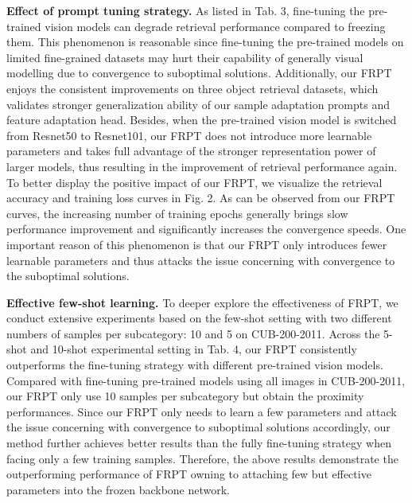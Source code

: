 \documentclass[letterpaper]{article} %
\begin{document}
\textbf{Effect of prompt tuning strategy.} As listed in Tab. 3, fine-tuning the pre-trained vision models can degrade retrieval performance compared to freezing them. This phenomenon is reasonable since fine-tuning the pre-trained models on limited fine-grained datasets may hurt their capability of generally visual modelling due to convergence to suboptimal solutions.
Additionally, our FRPT enjoys the consistent improvements on three object retrieval datasets, which validates stronger generalization ability of our sample adaptation prompts and feature adaptation head. Besides, when the pre-trained vision model is switched from Resnet50 to Resnet101, our FRPT does not introduce more learnable parameters and takes full advantage of the stronger representation power of larger models, thus resulting in the improvement of retrieval performance again.
To better display the positive impact of our FRPT, we visualize the retrieval accuracy and training loss curves in Fig. 2. As can be observed from our FRPT curves, the increasing number of training epochs generally brings slow performance improvement and significantly increases the convergence speeds. One important reason of this phenomenon is that our FRPT only introduces fewer learnable parameters and thus attacks the issue concerning with convergence to the suboptimal solutions.

\textbf{Effective few-shot learning.} To deeper explore the effectiveness of FRPT, we conduct extensive experiments based on the few-shot setting with two different numbers of samples per subcategory: 10 and 5 on CUB-200-2011. Across the 5-shot and 10-shot experimental setting in Tab. 4, our FRPT consistently outperforms the fine-tuning strategy with different pre-trained vision models. Compared with fine-tuning pre-trained models using all images in CUB-200-2011, our FRPT only use 10 samples per subcategory but obtain the proximity performances. Since our FRPT only needs to learn a few parameters and attack the issue concerning with convergence to suboptimal solutions accordingly, our method further achieves better results than the fully fine-tuning strategy when facing only a few training samples. Therefore, the above results demonstrate the outperforming performance of FRPT owning to attaching few but effective parameters into the frozen backbone network.
\end{document}
